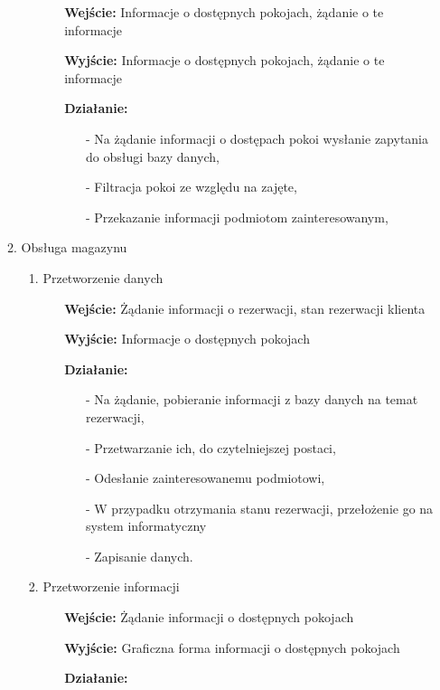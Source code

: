 \documentclass[a4paper, 11pt]{article}
\begin{document}
\begin{enumerate}[label*=\arabic*.]
\begin{enumerate}[label*=\arabic*.]
\begin{enumerate}[label*=\arabic*.]
\begin{itemize}
					\item[\textbf{Wejście:}] Informacje o dostępnych pokojach, żądanie o te informacje
					\item[\textbf{Wyjście:}] Informacje o dostępnych pokojach, żądanie o te informacje
					\item[\textbf{Działanie:}] 
					\begin{itemize}
						\item[-] Na żądanie informacji o dostępach pokoi wysłanie zapytania do obsługi bazy danych,
						\item[-] Filtracja pokoi ze względu na zajęte,
						\item[-] Przekazanie informacji podmiotom zainteresowanym,
					\end{itemize}														
				\end{itemize}	
			\end{enumerate}
			\item Obsługa magazynu
			\begin{enumerate}[label*=\arabic*.]
				\item Przetworzenie danych
				\begin{itemize}
					\item[\textbf{Wejście:}] Żądanie informacji o rezerwacji,  stan rezerwacji klienta
					\item[\textbf{Wyjście:}] Informacje o dostępnych pokojach
					\item[\textbf{Działanie:}] 
					\begin{itemize}
						\item[-] Na żądanie, pobieranie informacji z bazy danych na temat rezerwacji,
						\item[-] Przetwarzanie ich, do czytelniejszej postaci,
						\item[-] Odesłanie zainteresowanemu podmiotowi,
						\item[-] W przypadku otrzymania stanu rezerwacji, przełożenie go na system informatyczny
						\item[-] Zapisanie danych.
					\end{itemize}														
				\end{itemize}	
				\item Przetworzenie informacji
				\begin{itemize}
					\item[\textbf{Wejście:}] Żądanie  informacji o dostępnych pokojach
					\item[\textbf{Wyjście:}] Graficzna forma informacji o dostępnych pokojach
					\item[\textbf{Działanie:}]

\end{itemize}
\end{enumerate}
\end{enumerate}
\end{enumerate}
\end{document}
